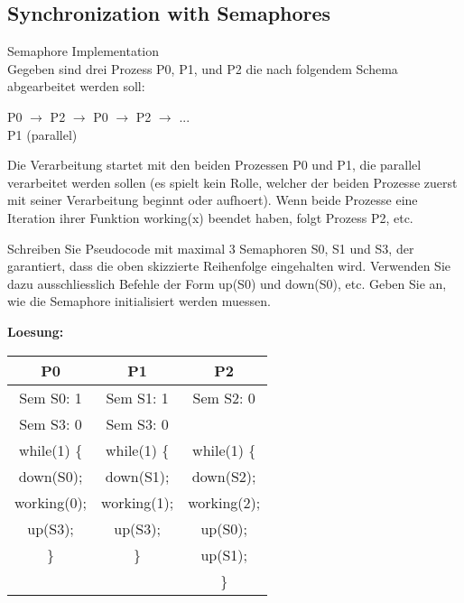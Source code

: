 \subsection{Synchronization with Semaphores}

\begin{example2}{Semaphore Implementation}\\
    Gegeben sind drei Prozess P0, P1, und P2 die nach folgendem Schema abgearbeitet werden soll:
    
    \begin{center}
    P0 $\rightarrow$ P2 $\rightarrow$ P0 $\rightarrow$ P2 $\rightarrow$ ...\\
    P1 (parallel)
    \end{center}
    
    Die Verarbeitung startet mit den beiden Prozessen P0 und P1, die parallel verarbeitet werden sollen (es spielt kein Rolle, welcher der beiden Prozesse zuerst mit seiner Verarbeitung beginnt oder aufhoert). Wenn beide Prozesse eine Iteration ihrer Funktion working(x) beendet haben, folgt Prozess P2, etc.
    
    Schreiben Sie Pseudocode mit maximal 3 Semaphoren S0, S1 und S3, der garantiert, dass die oben skizzierte Reihenfolge eingehalten wird. Verwenden Sie dazu ausschliesslich Befehle der Form up(S0) und down(S0), etc. Geben Sie an, wie die Semaphore initialisiert werden muessen.
    
    \tcblower
    
    \textbf{Loesung:}
    \begin{center}
    \begin{tabular}{|c|c|c|}
    \hline
    \textbf{P0} & \textbf{P1} & \textbf{P2} \\
    \hline
    Sem S0: 1 & Sem S1: 1 & Sem S2: 0 \\
    Sem S3: 0 & Sem S3: 0 & \\
    \hline
    while(1) \{ & while(1) \{ & while(1) \{ \\
    \quad down(S0); & \quad down(S1); & \quad down(S2); \\
    \quad working(0); & \quad working(1); & \quad working(2); \\
    \quad up(S3); & \quad up(S3); & \quad up(S0); \\
    \} & \} & \quad up(S1); \\
     &  & \} \\
    \hline
    \end{tabular}
    \end{center}
    

\end{example2}
